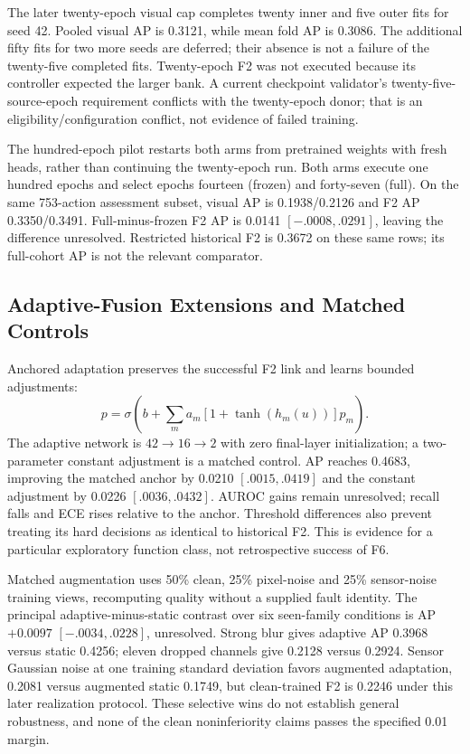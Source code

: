 The later twenty-epoch visual cap completes twenty inner and five outer fits for seed
42. Pooled visual AP is 0.3121, while mean fold AP is 0.3086. The additional fifty fits
for two more seeds are deferred; their absence is not a failure of the twenty-five
completed fits. Twenty-epoch F2 was not executed because its controller expected the
larger bank. A current checkpoint validator's twenty-five-source-epoch requirement
conflicts with the twenty-epoch donor; that is an eligibility/configuration conflict,
not evidence of failed training.

The hundred-epoch pilot restarts both arms from pretrained weights with fresh heads,
rather than continuing the twenty-epoch run. Both arms execute one hundred epochs and
select epochs fourteen (frozen) and forty-seven (full). On the same 753-action
assessment subset, visual AP is 0.1938/0.2126 and F2 AP 0.3350/0.3491. Full-minus-frozen
F2 AP is 0.0141 $[-.0008,.0291]$, leaving the difference unresolved. Restricted
historical F2 is 0.3672 on these same rows; its full-cohort AP is not the relevant
comparator.

\subsection{Adaptive-Fusion Extensions and Matched Controls}
Anchored adaptation preserves the successful F2 link and learns bounded adjustments:
\begin{equation}p=\sigma\!\left(b+\sum_m a_m[1+\tanh(h_m(u))]p_m\right).\end{equation}
The adaptive network is $42\rightarrow16\rightarrow2$ with zero final-layer
initialization; a two-parameter constant adjustment is a matched control. AP reaches
0.4683, improving the matched anchor by 0.0210 $[.0015,.0419]$ and the constant
adjustment by 0.0226 $[.0036,.0432]$. AUROC gains remain unresolved; recall falls and
ECE rises relative to the anchor. Threshold differences also prevent treating its hard
decisions as identical to historical F2. This is evidence for a particular exploratory
function class, not retrospective success of F6.

Matched augmentation uses 50\% clean, 25\% pixel-noise and 25\% sensor-noise training
views, recomputing quality without a supplied fault identity. The principal
adaptive-minus-static contrast over six seen-family conditions is AP $+0.0097$
$[-.0034,.0228]$, unresolved. Strong blur gives adaptive AP 0.3968 versus static 0.4256;
eleven dropped channels give 0.2128 versus 0.2924. Sensor Gaussian noise at one training
standard deviation favors augmented adaptation, 0.2081 versus augmented static 0.1749,
but clean-trained F2 is 0.2246 under this later realization protocol. These selective
wins do not establish general robustness, and none of the clean noninferiority claims
passes the specified 0.01 margin.

